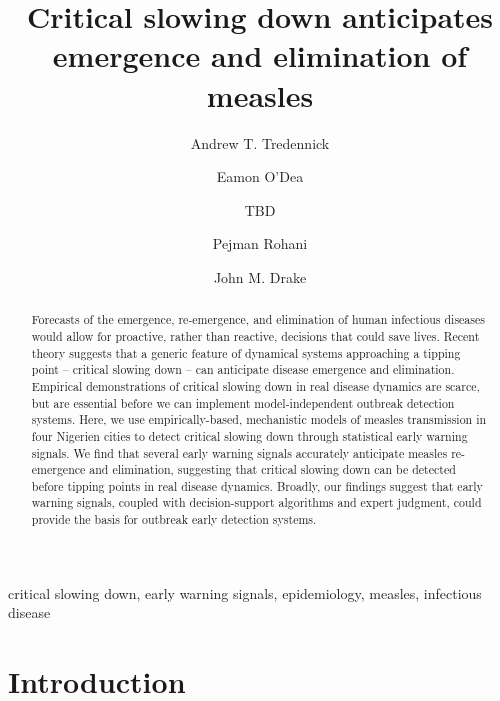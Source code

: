 \documentclass[3p]{elsarticle} %
\begin{document}
\begin{frontmatter}

  \title{Critical slowing down anticipates emergence and elimination of measles}
    \author[UGA,CEID]{Andrew T. Tredennick}
    \author[UGA,CEID]{Eamon O'Dea}
  
  
    \author[other]{TBD}
  
  
    \author[UGA,CEID,ID]{Pejman Rohani}
  
  
    \author[UGA,CEID]{John M. Drake}
  
      \address[UGA]{Odum School of Ecology, University of Georgia, Athens, GA 30602, USA}
    \address[CEID]{Center for the Ecology of Infectious Diseases, University of Georgia,
Athens, GA 30602, USA}
    \address[other]{A University of Somewhere}
    \address[ID]{Department of Infectious Diseases, University of Georgia, Athens, GA
30602, USA}
  
  \begin{abstract}
  Forecasts of the emergence, re-emergence, and elimination of human
  infectious diseases would allow for proactive, rather than reactive,
  decisions that could save lives. Recent theory suggests that a generic
  feature of dynamical systems approaching a tipping point -- critical
  slowing down -- can anticipate disease emergence and elimination.
  Empirical demonstrations of critical slowing down in real disease
  dynamics are scarce, but are essential before we can implement
  model-independent outbreak detection systems. Here, we use
  empirically-based, mechanistic models of measles transmission in four
  Nigerien cities to detect critical slowing down through statistical
  early warning signals. We find that several early warning signals
  accurately anticipate measles re-emergence and elimination, suggesting
  that critical slowing down can be detected before tipping points in real
  disease dynamics. Broadly, our findings suggest that early warning
  signals, coupled with decision-support algorithms and expert judgment,
  could provide the basis for outbreak early detection systems.
  \end{abstract}
   \begin{keyword} critical slowing down, early warning signals, epidemiology, measles, infectious disease\end{keyword}
 \end{frontmatter}

\hypertarget{introduction}{%
\section{Introduction}\label{introduction}}
\end{document}
